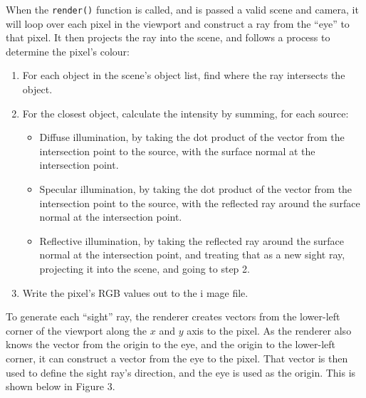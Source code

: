 \documentclass[a4paper]{article}
\begin{document}
When the \verb|render()| function is called, and is passed a valid scene and camera, it will loop over each pixel in the viewport and construct a ray from the ``eye'' to that pixel. It then projects the ray into the scene, and follows a process to determine the pixel's colour:
\begin{enumerate}
  \item For each object in the scene's object list, find where the ray intersects the object.
  \item For the closest object, calculate the intensity by summing, for each source:
  \begin{itemize}
    \item Diffuse illumination, by taking the dot product of the vector from the intersection point to the source, with the surface normal at the intersection point.
    \item Specular illumination, by taking the dot product of the vector from the intersection point to the source, with the reflected ray around the surface normal at the intersection point.
    \item Reflective illumination, by taking the reflected ray around the surface normal at the intersection point, and treating that as a new sight ray, projecting it into the scene, and going to step 2.
  \end{itemize}
  \item Write the pixel's RGB values out to the i
  mage file.
\end{enumerate}
To generate each ``sight'' ray, the renderer creates vectors from the lower-left corner of the viewport along the $x$ and $y$ axis to the pixel. As the renderer also knows the vector from the origin to the eye, and the origin to the lower-left corner, it can construct a vector from the eye to the pixel. That vector is then used to define the sight ray's direction, and the eye is used as the origin. This is shown below in Figure 3.
\end{document}
